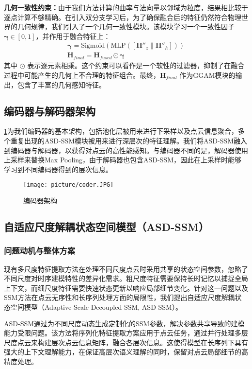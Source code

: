 \documentclass[preprint,12pt]{elsarticle}
\begin{document}
\textbf{几何一致性约束：}由于我们方法计算的曲率与法向量以邻域为粒度，结果相比较于逐点计算不够精确。在引入双分支学习后，为了确保融合后的特征仍然符合物理世界的几何规律，我们引入了一个几何一致性模块。该模块学习一个一致性因子 $\boldsymbol{\gamma} \in [0, 1]$，并作用于融合特征上：
\begin{gather}
	\boldsymbol{\gamma} = \text{Sigmoid}(\text{MLP}([\mathbf{H}''_z \| \mathbf{H}''_h])) \label{eq:consistency_factor} \\
	\mathbf{H}_{final} = \mathbf{H}_{fused} \odot \boldsymbol{\gamma} \label{eq:final_feature}
\end{gather}
其中 $\odot$ 表示逐元素相乘。这个约束可以看作是一个软性的过滤器，抑制了在融合过程中可能产生的几何上不合理的特征组合。最终，$\mathbf{H}_{final}$ 作为GGAM模块的输出，包含了丰富的几何感知特征。

\subsection{编码器与解码器架构}
\cref{fig:coder}为我们编码器的基本架构，包括池化层被用来进行下采样以及点云信息聚合，多个重复出现的ASD-SSM模块被用来进行深层次的特征理解。我们将ASD-SSM融入到编码器与解码器，以获得对点云的高性能感知。与编码器不同的是，解码器使用上采样来替换Max Pooling，由于解码器也包含ASD-SSM，因此在上采样时能够学习到不同编码器得到的层次信息。

\begin{figure}[htbp]
	\centering
	\texttt{[image: picture/coder.JPG]}
	\caption{编码器架构}
	\label{fig:coder}
\end{figure}
\subsection{自适应尺度解耦状态空间模型（ASD-SSM）}

\subsubsection{问题动机与整体方案}

现有多尺度特征提取方法在处理不同尺度点云时采用共享的状态空间参数，忽略了不同尺度对时序建模特性的差异化需求。粗尺度特征需要保持长时记忆以捕捉全局上下文，而细尺度特征需要快速状态更新以响应局部细节变化。针对这一问题以及SSM方法在点云无序性和长序列处理方面的局限性，我们提出自适应尺度解耦状态空间模型（Adaptive Scale-Decoupled SSM, ASD-SSM）。

ASD-SSM通过为不同尺度动态生成定制化的SSM参数，解决参数共享导致的建模能力受限问题。该方法将序列化特征提取方案应用于点云任务，通过并行处理多层尺度点云来构建层次点云信息矩阵，融合各层次信息。这使得模型在长序列下具有强大的上下文理解能力，在保证高层次语义理解的同时，保留对点云局部细节的高精度处理。
\end{document}
